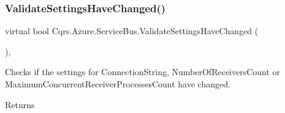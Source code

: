 \subsubsection{\texorpdfstring{Validate\+Settings\+Have\+Changed()}{ValidateSettingsHaveChanged()}}
{\footnotesize\ttfamily virtual bool Cqrs.\+Azure.\+Service\+Bus.\+Validate\+Settings\+Have\+Changed (\begin{DoxyParamCaption}{ }\end{DoxyParamCaption})\hspace{0.3cm}{\ttfamily [protected]}, {\ttfamily [virtual]}}



Checks if the settings for Connection\+String, Number\+Of\+Receivers\+Count or Maximum\+Concurrent\+Receiver\+Processes\+Count have changed. 

\begin{DoxyReturn}{Returns}

\end{DoxyReturn}
